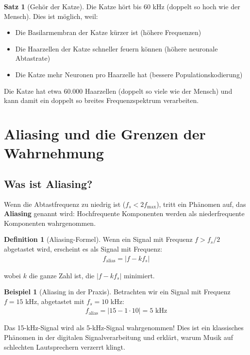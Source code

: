 ﻿\documentclass[a4paper,12pt]{report}
\theoremstyle{definition}
\newtheorem{definition}{Definition}
\newtheorem{beispiel}{Beispiel}
\newtheorem{satz}{Satz}
\begin{document}
	\begin{satz}[Gehör der Katze]
		Die Katze hört bis 60 kHz (doppelt so hoch wie der Mensch). Dies ist möglich, weil:
		\begin{itemize}
			\item[-] Die Basilarmembran der Katze kürzer ist (höhere Frequenzen)
			\item[-] Die Haarzellen der Katze schneller feuern können (höhere neuronale Abtastrate)
			\item[-] Die Katze mehr Neuronen pro Haarzelle hat (bessere Populationskodierung)
		\end{itemize}
		
		Die Katze hat etwa 60.000 Haarzellen (doppelt so viele wie der Mensch) und kann damit ein doppelt so breites Frequenzspektrum verarbeiten.
	\end{satz}
	
	\section{Aliasing und die Grenzen der Wahrnehmung}
	
	\subsection{Was ist Aliasing?}
	
	Wenn die Abtastfrequenz zu niedrig ist ($f_s < 2f_{\max}$), tritt ein Phänomen auf, das \textbf{Aliasing} genannt wird: Hochfrequente Komponenten werden als niederfrequente Komponenten wahrgenommen.
	
	\begin{definition}[Aliasing-Formel]
		Wenn ein Signal mit Frequenz $f > f_s/2$ abgetastet wird, erscheint es als Signal mit Frequenz:
		\begin{align}
			f_{\text{alias}} = |f - k f_s|
		\end{align}
		
		wobei $k$ die ganze Zahl ist, die $|f - k f_s|$ minimiert.
	\end{definition}
	
	\begin{beispiel}[Aliasing in der Praxis]
		Betrachten wir ein Signal mit Frequenz $f = 15$ kHz, abgetastet mit $f_s = 10$ kHz:
		\begin{align}
			f_{\text{alias}} = |15 - 1 \cdot 10| = 5 \text{ kHz}
		\end{align}
		
		Das 15-kHz-Signal wird als 5-kHz-Signal wahrgenommen! Dies ist ein klassisches Phäno\-men in der digitalen Signalverarbeitung und erklärt, warum Musik auf schlechten Lautsprechern verzerrt klingt.
	\end{beispiel}
	
\end{document}
